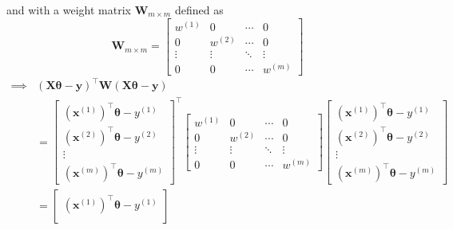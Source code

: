 and with a weight matrix \( \mathbf{W}_{m \times m} \) defined as
\begin{equation*}
    \mathbf{W}_{m \times m}
    =
    \begin{bmatrix}
        w^{(1)} & 0       & \cdots & 0       \\
        0       & w^{(2)} & \cdots & 0       \\
        \vdots  & \vdots  & \ddots & \vdots  \\
        0       & 0       & \cdots & w^{(m)}
    \end{bmatrix}
\end{equation*}
\begin{align*}
    \implies
     &
    {(\mathbf{X} \boldsymbol{\theta} - \mathbf{y})}^\top \mathbf{W} (\mathbf{X} \boldsymbol{\theta} - \mathbf{y})
    \\ & =
    \begin{bmatrix}
        {\left(\mathbf{x}^{(1)}\right)}^\top \boldsymbol{\theta} - y^{(1)} \\
        {\left(\mathbf{x}^{(2)}\right)}^\top \boldsymbol{\theta} - y^{(2)} \\
        \vdots                                                             \\
        {\left(\mathbf{x}^{(m)}\right)}^\top \boldsymbol{\theta} - y^{(m)}
    \end{bmatrix}^\top
    \begin{bmatrix}
        w^{(1)} & 0       & \cdots & 0       \\
        0       & w^{(2)} & \cdots & 0       \\
        \vdots  & \vdots  & \ddots & \vdots  \\
        0       & 0       & \cdots & w^{(m)}
    \end{bmatrix}
    \begin{bmatrix}
        {\left(\mathbf{x}^{(1)}\right)}^\top \boldsymbol{\theta} - y^{(1)} \\
        {\left(\mathbf{x}^{(2)}\right)}^\top \boldsymbol{\theta} - y^{(2)} \\
        \vdots                                                             \\
        {\left(\mathbf{x}^{(m)}\right)}^\top \boldsymbol{\theta} - y^{(m)}
    \end{bmatrix}
    \\ & =
    \begin{bmatrix}
        {\left(\mathbf{x}^{(1)}\right)}^\top \boldsymbol{\theta} - y^{(1)} \\

\end{bmatrix}
\end{align*}
